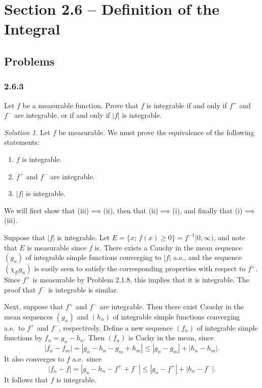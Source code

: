 \documentclass{report}
\theoremstyle{remark}
\newtheorem*{solution}{Solution}
\begin{document}
\section*{Section 2.6 -- Definition of the Integral}

\subsection*{Problems}

\subsubsection*{2.6.3}
Let $f$ be a measurable function. Prove that $f$ is integrable if and only if $f^+$ and $f^-$ are integrable, or if and only if $|f|$ is integrable.

\begin{solution}
  Let $f$ be measurable. We must prove the equivalence of the following statements:
  \begin{enumerate}[label=(\roman*)]
    \item $f$ is integrable.
    \item $f^+$ and $f^-$ are integrable.
    \item $|f|$ is integrable.
  \end{enumerate}
  We will first show that (iii)$\implies$(ii), then that (ii)$\implies$(i), and finally that (i)$\implies$(iii).

  Suppose that $|f|$ is integrable. Let $E = \{x; \, f(x) \ge 0\} = f^{-1}{[0,\infty)}$, and note that $E$ is measurable since $f$ is. There exists a Cauchy in the mean sequence $(g_n)$ of integrable simple functions converging to $|f|$ a.e., and the sequence $(\chi_E g_n)$ is easily seen to satisfy the corresponding properties with respect to $f^+$. Since $f^+$ is measurable by Problem 2.1.8, this implies that it is integrable. The proof that $f^-$ is integrable is similar.

  Next, suppose that $f^+$ and $f^-$ are integrable. Then there exist Cauchy in the mean sequences $(g_n)$ and $(h_n)$ of integrable simple functions converging a.e.\ to $f^+$ and $f^-$, respectively. Define a new sequence $(f_n)$ of integrable simple functions by $f_n = g_n - h_n$. Then $(f_n)$ is Cachy in the mean, since
  \begin{equation*}
    |f_n - f_m| = |g_n - h_n - g_m + h_m| \le |g_n - g_m| + |h_n - h_m|.
  \end{equation*}
  It also converges to $f$ a.e.\, since
  \begin{equation*}
    |f_n - f| = |g_n - h_n - f^+ + f^-| \le |g_n - f^+| + |h_n - f^-|.
  \end{equation*}
  It follows that $f$ is integrable.


\end{solution}
\end{document}
